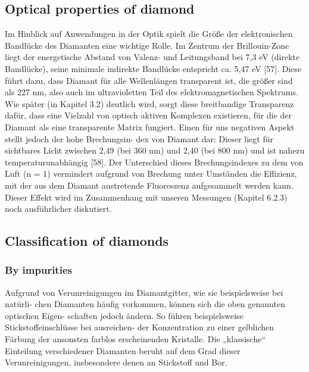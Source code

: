   \subsection{Optical properties of diamond}

    Im Hinblick auf Anwendungen in der Optik spielt die Größe der elektronischen Bandlücke des Diamanten eine wichtige Rolle. Im Zentrum der Brillouin-Zone liegt der energetische Abstand von Valenz- und Leitungsband bei 7,3 eV (direkte Bandlücke), seine minimale indirekte Bandlücke entspricht ca. 5,47 eV [57]. Diese führt dazu, dass Diamant für alle Wellenlängen transparent ist, die größer sind als 227 nm, also auch im ultravioletten Teil des elektromagnetischen Spektrums. Wie später (in Kapitel 3.2) deutlich wird, sorgt diese breitbandige Transparenz dafür, dass eine Vielzahl von optisch aktiven Komplexen existieren, für die der Diamant als eine transparente Matrix fungiert. Einen für uns negativen Aspekt stellt jedoch der hohe Brechungsin- dex von Diamant dar: Dieser liegt für sichtbares Licht zwischen 2,49 (bei 360 nm) und 2,40 (bei 800 nm) und ist nahezu temperaturunabhängig [58]. Der Unterschied dieses Brechungsindexes zu dem von Luft (n = 1) vermindert aufgrund von Brechung unter Umständen die Effizienz, mit der aus dem Diamant austretende Fluoreszenz aufgesammelt werden kann. Dieser Effekt wird im Zusammenhang mit unseren Messungen (Kapitel 6.2.3) noch ausführlicher diskutiert.

  \subsection{Classification of diamonds}

    \subsubsection{By impurities}

      Aufgrund von Verunreinigungen im Diamantgitter, wie sie beispielsweise bei natürli- chen Diamanten häufig vorkommen, können sich die oben genannten optischen Eigen-
      schaften jedoch ändern. So führen beispielsweise Stickstoffeinschlüsse bei ausreichen- der Konzentration zu einer gelblichen Färbung der ansonsten farblos erscheinenden Kristalle. Die „klassische“ Einteilung verschiedener Diamanten beruht auf dem Grad dieser Verunreinigungen, insbesondere denen an Stickstoff und Bor.

